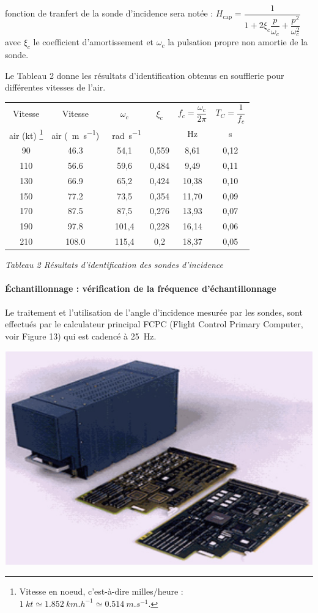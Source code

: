 \begin{multicols}{2}
fonction de tranfert de la sonde d’incidence sera notée : $H_{\text{cap}}=\dfrac{1}{1+2\xi_c \dfrac{p}{\omega_c}+\dfrac{p^2}{\omega_c^2}}$ avec $\xi_c$ le coefficient d’amortissement et $\omega_c$ la pulsation propre
non amortie de la sonde.

Le Tableau 2 donne les résultats d’identification obtenus en soufflerie pour différentes vitesses de l’air.

\footnotesize

\begin{center}
\begin{tabular}{|c|c|c|c|c|c|}
\hline
Vitesse  
& Vitesse 
& $\omega_c$  & $\xi_c$ & $f_c=\dfrac{\omega_c}{2\pi}$ & $T_C=\dfrac{1}{f_c}$ \\
air (kt) \footnote{Vitesse en noeud, c’est-à-dire milles/heure : $\SI{1}{kt}\simeq \SI{1,852}{km.h^{-1}} \simeq \SI{0,514}{m.s^{-1}}$.}
& air (\SI{}{m.s^{-1}})
& \SI{}{rad.s^{-1}}
&
 &Hz
 & s \\ \hline
90 & 46.3 & 54,1 & 0,559 & 8,61 & 0,12 \\ \hline
110 & 56.6 & 59,6 & 0,484 & 9,49 & 0,11 \\ \hline
130 & 66.9 & 65,2 & 0,424 & 10,38 & 0,10 \\ \hline
150 & 77.2 & 73,5 & 0,354 & 11,70 & 0,09 \\ \hline
170 & 87.5 & 87,5 & 0,276 & 13,93 & 0,07 \\ \hline
190 & 97.8 & 101,4 & 0,228 & 16,14 & 0,06 \\ \hline
210 & 108.0 & 115,4 & 0,2 & 18,37 & 0,05 \\ \hline
\end{tabular}


\textit{Tableau 2 Résultats d'identification des sondes d'incidence}

\end{center}
\normalsize

\paragraph*{Échantillonnage : vérification de la fréquence d’échantillonnage}
Le traitement et l’utilisation de l’angle d’incidence mesurée par les sondes, sont
effectués par le calculateur principal FCPC (Flight Control Primary Computer,
voir Figure 13) qui est cadencé à \SI{25}{Hz}.

\begin{center}
\includegraphics[width=.7\linewidth]{images/fig_16}


\end{center}
\end{multicols}
